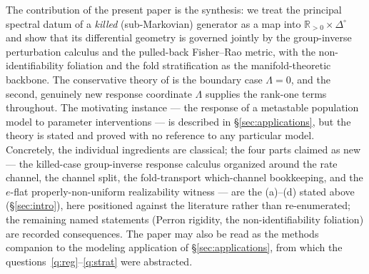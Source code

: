 \documentclass[11pt,reqno]{amsart}
\theoremstyle{plain}
\theoremstyle{definition}
\theoremstyle{remark}
\newcommand{\R}{\mathbb{R}}
\newcommand{\Simp}{\Delta^{\!\circ}}
\begin{document}
The contribution of the present paper is the synthesis: we treat the principal
spectral datum of a \emph{killed} (sub-Markovian) generator as a map into
$\R_{>0}\times\Simp$ and show that its differential geometry is governed jointly
by the group-inverse perturbation calculus and the pulled-back Fisher--Rao
metric, with the non-identifiability foliation and the fold stratification as the
manifold-theoretic backbone. The conservative theory of
\cite{Schweitzer1968,Meyer1975} is the boundary case $\Lambda=0$, and the second,
genuinely new response coordinate $\Lambda$ supplies the rank-one terms
throughout. The motivating instance --- the response of a metastable population
model to parameter interventions --- is described in
\S\ref{sec:applications}, but the theory is stated and proved with no reference to
any particular model. Concretely, the individual ingredients are classical; the four parts claimed as
new --- the killed-case group-inverse response calculus organized around the rate channel, the channel
split, the fold-transport which-channel bookkeeping, and the $e$-flat properly-non-uniform
realizability witness --- are the (a)--(d) stated above (\S\ref{sec:intro}), here positioned against the
literature rather than re-enumerated; the remaining named statements (Perron rigidity, the
non-identifiability foliation) are recorded consequences. The paper may also be read
as the methods companion to the modeling application of \S\ref{sec:applications},
from which the questions~\ref{q:reg}--\ref{q:strat} were abstracted.
\end{document}
